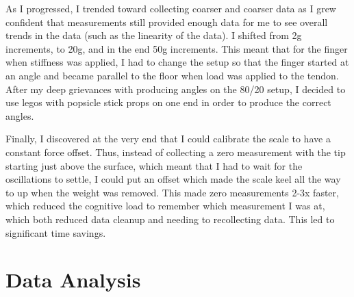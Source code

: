 \documentclass[12pt]{article}
\begin{document}
As I progressed, I trended toward collecting coarser and coarser data as I grew confident
that measurements still provided enough data for me to see overall trends in the data
(such as the linearity of the data). I shifted from 2g increments, to 20g, and in the end 50g
increments. This meant that for the finger when stiffness was applied, I had to change the setup so
that the finger started at an angle and became parallel to the floor when load was applied to the
tendon. After my deep grievances with producing angles on the 80/20 setup, I decided to use legos
with popsicle stick props on one end in order to produce the correct angles.

Finally, I discovered at the very end that I could calibrate the scale to have a constant force
offset. Thus, instead of collecting a zero measurement with the tip starting just above the surface,
which meant that I had to wait for the oscillations to settle, I could put an offset which made the
scale keel all the way to up when the weight was removed. This made zero measurements 2-3x
faster, which reduced the cognitive load to remember which measurement I was at, which both reduced
data cleanup and needing to recollecting data. This led to significant time savings.


\section{Data Analysis}\label{sec:analisedosdados}





\end{document}

